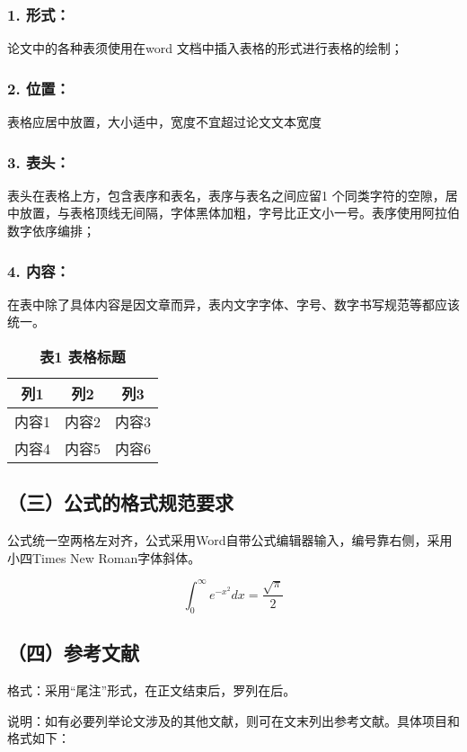 \documentclass[UTF8,AutoFakeBold]{ctexbook}
\begin{document}
\subsubsection*{1. 形式：}
论文中的各种表须使用在word 文档中插入表格的形式进行表格的绘制；

\subsubsection*{2. 位置：}
表格应居中放置，大小适中，宽度不宜超过论文文本宽度

\subsubsection*{3. 表头：}
表头在表格上方，包含表序和表名，表序与表名之间应留1 个同类字符的空隙，居中放置，与表格顶线无间隔，字体黑体加粗，字号比正文小一号。表序使用阿拉伯数字依序编排；

\subsubsection*{4. 内容：}
在表中除了具体内容是因文章而异，表内文字字体、字号、数字书写规范等都应该统一。

\begin{table}[htbp]
\centering
\caption*{\heiti\bfseries{} 表1 表格标题} %
\begin{tabular}{|c|c|c|} %
\hline
\textbf{列1} & \textbf{列2} & \textbf{列3} \\ \hline
内容1 & 内容2 & 内容3 \\ \hline
内容4 & 内容5 & 内容6 \\ \hline
\end{tabular}
\end{table}

\subsection*{（三）公式的格式规范要求}
公式统一空两格左对齐，公式采用Word自带公式编辑器输入，编号靠右侧，采用小四Times New Roman字体斜体。

\[
\int_{0}^{\infty} e^{-x^2} dx = \frac{\sqrt{\pi}}{2}
\]

\subsection*{（四）参考文献}
格式：采用“尾注”形式，在正文结束后，罗列在后。

说明：如有必要列举论文涉及的其他文献，则可在文末列出参考文献。具体项目和格式如下：
\end{document}

